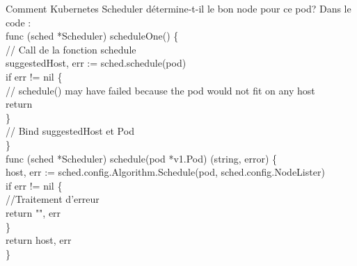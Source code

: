 \documentclass{bredelebeamer}
\begin{document}
\begin{frame}{Comment Kubernetes Scheduler détermine-t-il le bon node pour ce pod?}
Dans le code : \\
\textcolor{Framarouge}{func }\textcolor{Framaviolet}{(}\textcolor{Framaorange}{sched }\textcolor{Framaviolet}{*}\textcolor{Framaorange}{Scheduler}\textcolor{Framaviolet}{)} \textcolor{Framaviolet}{scheduleOne}() \{  \\
\hspace{10px}    \textcolor{Framavert}{// Call de la fonction schedule}\\


\hspace{10px}suggestedHost, err \textcolor{Framarouge}{:=} sched.\textcolor{Framableu}{schedule}(pod)	\\
\hspace{10px}\textcolor{Framarouge}{if} err != \textcolor{Framableu}{nil} \{	\\
\hspace{10px}\hspace{10px}	// schedule() may have failed because the pod would not fit on any host \\
	\hspace{10px}\hspace{10px}	\textcolor{Framarouge}{return}	\\
	\hspace{10px}\}	\\
\hspace{10px}    \textcolor{Framavert}{// Bind suggestedHost et Pod}\\
\}\\
\pause
\vspace{10px}
\textcolor{Framarouge}{func }\textcolor{Framaviolet}{(}\textcolor{Framaorange}{sched} \textcolor{Framaviolet}{*}\textcolor{Framaorange}{Scheduler}\textcolor{Framaviolet}{)}  \textcolor{Framaviolet}{schedule}(\textcolor{Framaorange}{pod} *\textcolor{Framaorange}{v1}.\textcolor{Framaorange}{Pod}) (\textcolor{Framaorange}{string}, \textcolor{Framaorange}{error}) \{	\\
\hspace{10px}host, err \textcolor{Framarouge}{:=} sched.config.Algorithm.\textcolor{Framableu}{Schedule}(pod, sched.config.NodeLister)	\\
\hspace{10px}\textcolor{Framarouge}{if} err != \textcolor{Framableu}{nil} \{	\\
\hspace{20px}		\textcolor{Framavert}{//Traitement d'erreur}	\\
\hspace{20px}		\textcolor{Framarouge}{return} "", err	\\
\hspace{10px}	\}	\\
\hspace{10px}	\textcolor{Framarouge}{return} host, err	\\
\}\\
\end{frame}
\end{document}
